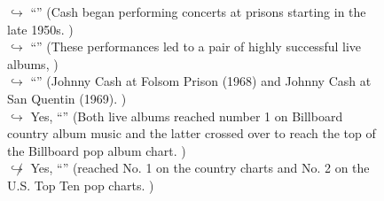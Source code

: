 \documentclass[11pt,a4paper, onecolumn]{article}
\begin{document}
\begin{figure}[t] \small \begin{tcolorbox}[boxsep=0pt,left=5pt,right=0pt,top=2pt,colback = yellow!5] \begin{dialogue}
 \small 
\colorbox{pink!25}{$\hookrightarrow$}
{ ``'' (Cash began performing concerts at prisons starting in the late 1950s. ) }
\\
\colorbox{pink!25}{$\hookrightarrow$}
{ ``'' (These performances led to a pair of highly successful live albums, ) }
\\
\colorbox{pink!25}{$\hookrightarrow$}
{ ``'' (Johnny Cash at Folsom Prison (1968) and Johnny Cash at San Quentin (1969). ) }
\\
\colorbox{pink!25}{$\hookrightarrow$}
\colorbox{red!25}{Yes,}
{ ``'' (Both live albums reached number 1 on Billboard country album music and the latter crossed over to reach the top of the Billboard pop album chart. ) }
\\
\colorbox{pink!25}{$\not\hookrightarrow$}
\colorbox{red!25}{Yes,}
{ ``'' (reached No. 1 on the country charts and No. 2 on the U.S. Top Ten pop charts. ) }
\\
 \end{dialogue}\end{tcolorbox}\end{figure}
\end{document}

